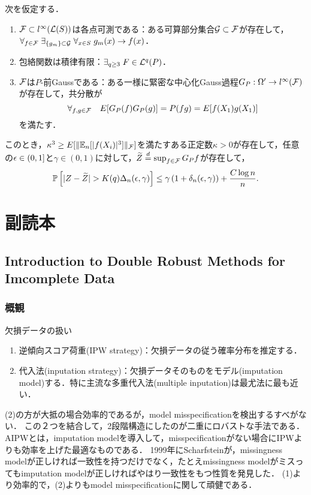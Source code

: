 \documentclass[uplatex,dvipdfmx]{jsreport}
\begin{document}
\begin{theorem}
    次を仮定する．
    \begin{enumerate}[({A}1)]
        \item $\mathcal{F}\subset l^\infty(\mathcal{L}(S))$は各点可測である：ある可算部分集合$\mathcal{G}\subset\mathcal{F}$が存在して，$\forall_{f\in\mathcal{F}}\;\exists_{\{g_m\}\subset\mathcal{G}}\;\forall_{x\in S}\;g_m(x)\to f(x)$．
        \item 包絡関数は積律有限：$\exists_{q\ge 3}\;F\in\mathcal{L}^q(P)$．
        \item $\mathcal{F}$は$P$-前Gaussである：ある一様に緊密な中心化Gauss過程$G_P:\Omega'\to l^\infty(\mathcal{F})$が存在して，共分散が
        \[\forall_{f,g\in\mathcal{F}}\quad E[G_P(f)G_P(g)]=P(fg)=E[f(X_1)g(X_1)]\]
        を満たす．
    \end{enumerate}
    このとき，$\kappa^3\ge E[\|\mathbb{E}_n[\lvert f(X_i)\rvert^3]\|_{\mathcal{F}}]$を満たすある正定数$\kappa>0$が存在して，任意の$\epsilon\in(0,1]$と$\gamma\in(0,1)$に対して，$\widetilde{Z}\overset{d}{=}\sup_{f\in\mathcal{F}}G_Pf$が存在して，
    \[\mathbb{P}\left[\lvert Z-\widetilde{Z}\rvert>K(q)\Delta_n(\epsilon,\gamma)\right]\le\gamma\left(1+\delta_n(\epsilon,\gamma)\right)+\frac{C\log n}{n}.\]
\end{theorem}

\chapter{副読本}

\section{Introduction to Double Robust Methods for Imcomplete Data}

\subsection{概観}

欠損データの扱い
\begin{enumerate}
    \item 逆傾向スコア荷重(IPW strategy)：欠損データの従う確率分布を推定する．
    \item 代入法(inputation strategy)：欠損データそのものをモデル(imputation model)する．特に主流な多重代入法(multiple inputation)は最尤法に最も近い．
\end{enumerate}
(2)の方が大抵の場合効率的であるが，model misspecificationを検出するすべがない．
この２つを結合して，2段階構造にしたのが二重にロバストな手法である．
AIPWとは，imputation modelを導入して，misspecificationがない場合にIPWよりも効率を上げた最適なものである．
1999年にScharfsteinが，missingness modelが正しければ一致性を持つだけでなく，たとえmissingness modelがミスってもimputation modelが正しければやはり一致性をもつ性質を発見した．
(1)より効率的で，(2)よりもmodel misspecificationに関して頑健である．
\end{document}
